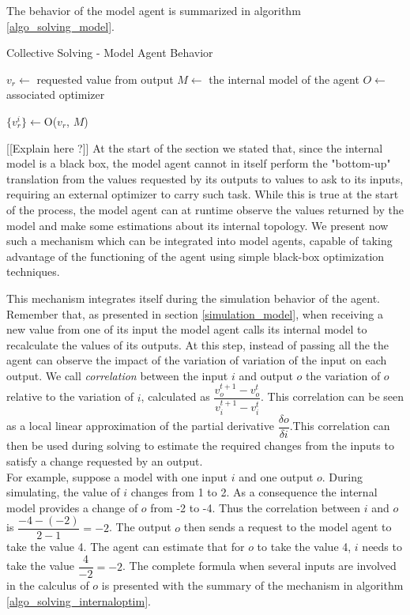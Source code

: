 The behavior of the model agent is summarized in algorithm \ref{algo_solving_model}.

\begin{algorithm}
\caption{Collective Solving - Model Agent Behavior}
\label{algo_solving_model}

	$v_r \leftarrow$ requested value from output\;
	$M \leftarrow$ the internal model of the agent\;
	$O \leftarrow$ associated optimizer\;
	
	$\{v_r^i\} \leftarrow $O($v_r$, $M$) \;
\end{algorithm}

[[Explain here ?]]
At the start of the section we stated that, since the internal model is a black box, the model agent cannot in itself perform the "bottom-up" translation from the values requested by its outputs to values to ask to its inputs, requiring an external optimizer to carry such task. While this is true at the start of the process, the model agent can at runtime observe the values returned by the model and make some estimations about its internal topology. We present now such a mechanism which can be integrated into model agents, capable of taking advantage of the functioning of the agent using simple black-box optimization techniques.

This mechanism integrates itself during the simulation behavior of the agent. Remember that, as presented in section \ref{simulation_model}, when receiving a new value from one of its input the model agent calls its internal model to recalculate the values of its outputs. At this step, instead of passing all the the agent can observe the impact of the variation of variation of the input on each output. We call \emph{correlation} between the input $i$ and output $o$ the variation of $o$ relative to the variation of $i$, calculated as $\dfrac{v_o^{t+1} - v_o^t}{v_i^{t+1} - v_i^t}$. This correlation can be seen as a local linear approximation of the partial derivative $\dfrac{\delta o}{\delta i}$.This correlation can then be used during solving to estimate the required changes from the inputs to satisfy a change requested by an output.\\
For example, suppose a model with one input $i$ and one output $o$. During simulating, the value of $i$ changes from 1 to 2. As a consequence the internal model provides a change of $o$ from -2 to -4. Thus the correlation between $i$ and $o$ is $\dfrac{-4 - (-2)}{2 - 1} = -2$. The output $o$ then sends a request to the model agent to take the value 4. The agent can estimate that for $o$ to take the value 4, $i$ needs to take the value $\dfrac{4}{-2} = -2$.
The complete formula when several inputs are involved in the calculus of $o$ is presented with the summary of the mechanism in algorithm \ref{algo_solving_internaloptim}.

